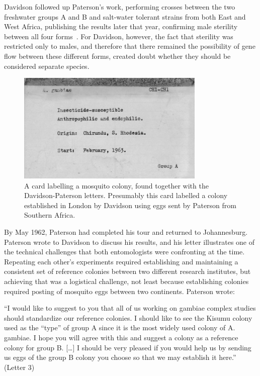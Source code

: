 \begin{refsection}
Davidson followed up Paterson's work, performing crosses between the two freshwater groups A and B and salt-water tolerant strains from both East and West Africa, publishing the results later that year, confirming male sterility between all four forms~\parencite{Davidson1962b}.
%
For Davidson, however, the fact that sterility was restricted only to males, and therefore that there remained the possibility of gene flow between these different forms, created doubt whether they should be considered separate species.


\begin{figure}[t]
\centering
\includegraphics[width=0.8\textwidth]{davidson-letters/Cards-colonies.pdf}
\caption{A card labelling a mosquito colony, found together with the Davidson-Paterson letters. Presumably this card labelled a colony established in London by Davidson using eggs sent by Paterson from Southern Africa.}
\label{fig:colony-cards}
\end{figure}


By May 1962, Paterson had completed his tour and returned to Johannesburg.
%
Paterson wrote to Davidson to discuss his results, and his letter illustrates one of the technical challenges that both entomologists were confronting at the time.
%
Repeating each other's experiments required establishing and maintaining a consistent set of reference colonies between two different research institutes, but achieving that was a logistical challenge, not least because establishing colonies required posting of mosquito eggs between two continents.
%
Paterson wrote:


\begin{displayquote}
``I would like to suggest to you that all of us working on gambiae complex studies should standardize our reference colonies. I should like to see the Kisumu colony used as the ``type'' of group A since it is the most widely used colony of A. gambiae. I hope you will agree with this and suggest a colony as a reference colony for group B. [\ldots] I should be very pleased if you would help us by sending us eggs of the group B colony you choose so that we may establish it here.'' (Letter 3)
\end{displayquote}



\end{refsection}
